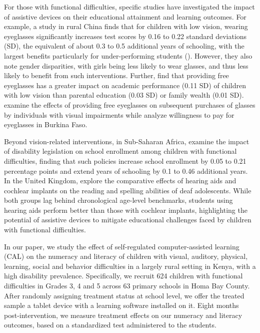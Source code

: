 \documentclass[hidelinks,12pt]{article}
\begin{document}
\begin{singlespace}
For those with functional difficulties, specific studies have investigated the impact of assistive devices on their educational attainment and learning outcomes. For example, a study in rural China finds that for children with low vision, wearing eyeglasses significantly increases test scores by 0.16 to 0.22 standard deviations (SD), the equivalent of about 0.3 to 0.5 additional years of schooling, with the largest benefits particularly for under-performing students (\cite{glewwe_better_2016}). However, they also note gender disparities, with girls being less likely to wear glasses, and thus less likely to benefit from such interventions. Further, \textcite{ma_effect_2014} find that providing free eyeglasses has a greater impact on academic performance (0.11 SD) of children with low vision than parental education (0.03 SD) or family wealth (0.01 SD). \textcite{wang_cluster-randomized_2017} examine the effects of providing free eyeglasses on subsequent purchases of glasses by individuals with visual impairments while \textcite{grimm_unblurring_2018} analyze willingness to pay for eyeglasses in Burkina Faso.

Beyond vision-related interventions, in Sub-Saharan Africa, \textcite{odhiambo_does_2023} examine the impact of disability legislation on school enrollment among children with functional difficulties, finding that such policies increase school enrollment by 0.05 to 0.21 percentage points and extend years of schooling by 0.1 to 0.46 additional years. In the United Kingdom, \textcite{harris_reading_2011} explore the comparative effects of hearing aids and cochlear implants on the reading and spelling abilities of deaf adolescents. While both groups lag behind chronological age-level benchmarks, students using hearing aids perform better than those with cochlear implants, highlighting the potential of assistive devices to mitigate educational challenges faced by children with functional difficulties. 

In our paper, we study the effect of self-regulated computer-assisted learning (CAL) on the numeracy and literacy of children with visual, auditory, physical, learning, social and behavior difficulties in a largely rural setting in Kenya, with a high disability prevalence. Specifically, we recruit 624 children with functional difficulties in Grades 3, 4 and 5 across 63 primary schools in Homa Bay County. After randomly assigning treatment status at school level, we offer the treated sample a tablet device with a learning software installed on it. Eight months post-intervention, we measure treatment effects on our numeracy and literacy outcomes, based on a standardized test administered to the students. 


\end{singlespace}
\end{document}
